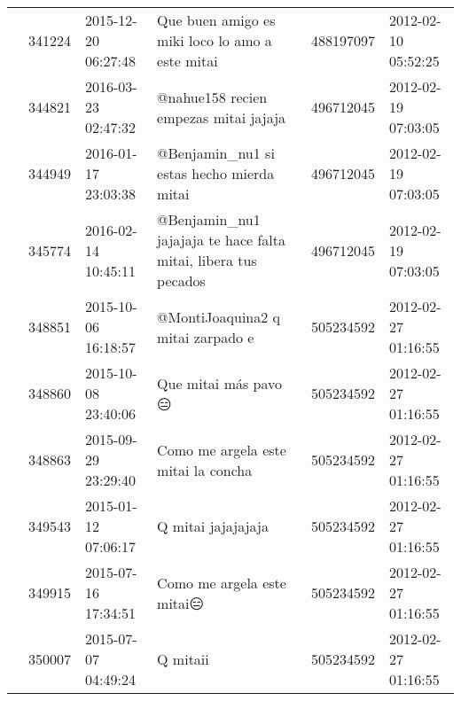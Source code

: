 \begin{tabular}{llllrl}
           & 341224  & 2015-12-20 06:27:48 &                                                                                              Que buen amigo es miki loco lo amo a este mitai &   488197097 & 2012-02-10 05:52:25 \\
           & 344821  & 2016-03-23 02:47:32 &                                                                                                        @nahue158 recien empezas mitai jajaja &   496712045 & 2012-02-19 07:03:05 \\
           & 344949  & 2016-01-17 23:03:38 &                                                                                                    @Benjamin\_nu1 si estas hecho mierda mitai &   496712045 & 2012-02-19 07:03:05 \\
           & 345774  & 2016-02-14 10:45:11 &                                                                               @Benjamin\_nu1 jajajaja te hace falta mitai, libera tus pecados &   496712045 & 2012-02-19 07:03:05 \\
           & 348851  & 2015-10-06 16:18:57 &                                                                                                            @MontiJoaquina2 q mitai zarpado e &   505234592 & 2012-02-27 01:16:55 \\
           & 348860  & 2015-10-08 23:40:06 &                                                                                                                         Que mitai más pavo 😑 &   505234592 & 2012-02-27 01:16:55 \\
           & 348863  & 2015-09-29 23:29:40 &                                                                                                          Como me argela este mitai la concha &   505234592 & 2012-02-27 01:16:55 \\
           & 349543  & 2015-01-12 07:06:17 &                                                                                                                           Q mitai jajajajaja &   505234592 & 2012-02-27 01:16:55 \\
           & 349915  & 2015-07-16 17:34:51 &                                                                                                                   Como me argela este mitai😑 &   505234592 & 2012-02-27 01:16:55 \\
           & 350007  & 2015-07-07 04:49:24 &                                                                                                                                     Q mitaii &   505234592 & 2012-02-27 01:16:55 \\

\end{tabular}
